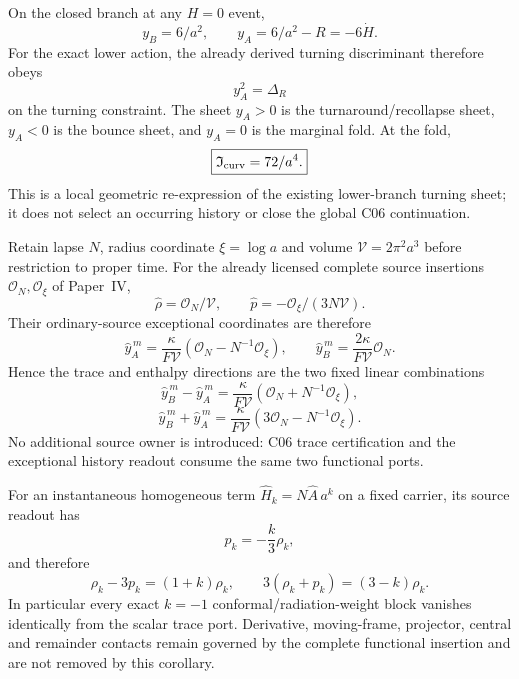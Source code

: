 \documentclass[12pt,a4paper]{article}
\begin{document}
\begin{corollary}
\label{p8:cor:v2185-flrw-e6-turning-sheets}
On the closed branch at any $H=0$ event,
\[
 y_B=6/a^2,\qquad y_A=6/a^2-R=-6\dot H.
\]
For the exact lower action, the already derived turning discriminant therefore
obeys
\[
 \boxed{y_A^2=\Delta_R}
\]
on the turning constraint.  The sheet $y_A>0$ is the turnaround/recollapse
sheet, $y_A<0$ is the bounce sheet, and $y_A=0$ is the marginal fold.  At the
fold,
\[
 \boxed{\mathfrak I_{\rm curv}=72/a^4.}
\]
This is a local geometric re-expression of the existing lower-branch turning
sheet; it does not select an occurring history or close the global C06
continuation.
\end{corollary}

\begin{proposition}
\label{p8:prop:v2185-c06-e6-functional-ports}
Retain lapse $N$, radius coordinate $\xi=\log a$ and volume
$\mathcal V=2\pi^2a^3$ before restriction to proper time.  For the already
licensed complete source insertions $\mathcal O_N,\mathcal O_\xi$ of Paper~IV,
\[
 \widehat\rho=\mathcal O_N/\mathcal V,\qquad
 \widehat p=-\mathcal O_\xi/(3N\mathcal V).
\]
Their ordinary-source exceptional coordinates are therefore
\[
 \boxed{\widehat y_A^{\,m}=\frac{\kappa}{F\mathcal V}
 \left(\mathcal O_N-N^{-1}\mathcal O_\xi\right),\qquad
 \widehat y_B^{\,m}=\frac{2\kappa}{F\mathcal V}\mathcal O_N.}
\]
Hence the trace and enthalpy directions are the two fixed linear combinations
\[
 \boxed{\widehat y_B^{\,m}-\widehat y_A^{\,m}
 =\frac{\kappa}{F\mathcal V}
 (\mathcal O_N+N^{-1}\mathcal O_\xi),}
\]
\[
 \boxed{\widehat y_B^{\,m}+\widehat y_A^{\,m}
 =\frac{\kappa}{F\mathcal V}
 (3\mathcal O_N-N^{-1}\mathcal O_\xi).}
\]
No additional source owner is introduced: C06 trace certification and the
exceptional history readout consume the same two functional ports.
\end{proposition}

\begin{corollary}
\label{p8:cor:v2185-c06-scale-weight-trace}
For an instantaneous homogeneous term $\widehat H_k=N\widehat A\,a^k$ on a
fixed carrier, its source readout has
\[
 p_k=-\frac{k}{3}\rho_k,
\]
and therefore
\[
 \boxed{\rho_k-3p_k=(1+k)\rho_k,\qquad
 3(\rho_k+p_k)=(3-k)\rho_k.}
\]
In particular every exact $k=-1$ conformal/radiation-weight block vanishes
identically from the scalar trace port.  Derivative, moving-frame, projector,
central and remainder contacts remain governed by the complete functional
insertion and are not removed by this corollary.
\end{corollary}
\end{document}
